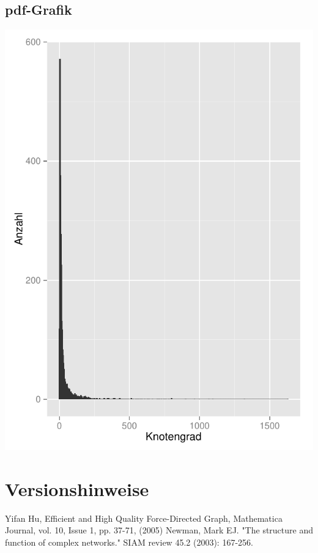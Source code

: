 \documentclass[12pt, a4paper]{article}
\begin{document}
\subsection{pdf-Grafik}
\includegraphics{testplot.pdf}


\section{Versionshinweise}

\newpage
\begin{thebibliography}{9}
	 Yifan Hu, Efficient and High Quality Force-Directed Graph, Mathematica Journal, vol. 10, Issue 1, pp. 37-71, (2005)
         Newman, Mark EJ. "The structure and function of complex networks." SIAM review 45.2 (2003): 167-256.
\end{thebibliography}
\end{document}
